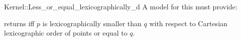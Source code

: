 \begin{ccRefFunctionObjectConcept}{Kernel::Less_or_equal_lexicographically_d}
A model for this must provide:


{returns  iff $p$ is lexicographically smaller
 than $q$ with respect to Cartesian lexicographic 
 order of points or equal to $q$.}

\end{ccRefFunctionObjectConcept}
